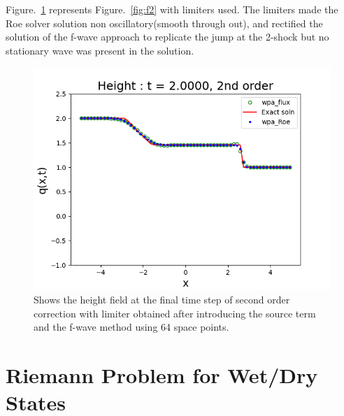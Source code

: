 \documentclass[11pt,a4paper]{article}
\newcommand{\donna}[1]{{\color{red}{#1}}}
\begin{document}
	Figure.~\ref{fig:f2lim} represents Figure.~\ref{fig:f2}  with limiters used. The limiters made the Roe solver solution non oscillatory(smooth through out), and rectified the solution of the f-wave approach to replicate the jump at the 2-shock but no stationary wave was present in the solution.
	\begin{figure}[H]
		\centering
		\includegraphics[width=0.5\linewidth]{images/2lim}
		\caption{Shows the height field at the final time step of second order correction with limiter obtained after introducing the source term and the f-wave method using 64 space points.}
		\label{fig:f2lim}
	\end{figure}
	\section{Riemann Problem for Wet/Dry States}
	
	
\end{document}
